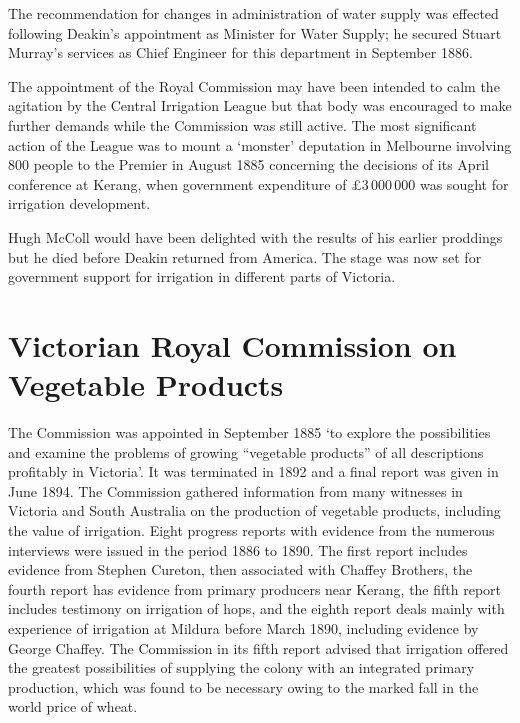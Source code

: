 The recommendation for changes in administration of water supply was
effected following Deakin's appointment as Minister for Water Supply;
he secured Stuart Murray's  services as Chief
Engineer for this department in September 1886.

The appointment of the Royal Commission may have been intended to calm
the agitation by the Central Irrigation League  but that body was encouraged to make further
demands while the Commission was still active.  The most significant
action of the League was to mount a `monster' deputation in Melbourne
involving 800 people to the Premier in August 1885 concerning the
decisions of its April conference at Kerang,  when
government expenditure of \pounds3\,000\,000 was sought for irrigation
development.

Hugh McColl would have been delighted with the results of his earlier
proddings but he died before Deakin returned from America.  The stage
was now set for government support for irrigation in different parts
of Victoria.

\section*{Victorian Royal Commission on Vegetable Products}

The Commission was appointed in September 1885 `to explore the
possibilities and examine the problems of growing ``vegetable
products'' of all descriptions profitably in Victoria'.  It was
terminated in 1892 and a final report was given in June 1894.  The
Commission gathered information from many witnesses in Victoria and
South Australia on the production of vegetable products, including the
value of irrigation.  Eight progress reports with evidence from the
numerous interviews were issued in the period 1886 to 1890.  The first
report includes evidence from Stephen Cureton, 
then associated with Chaffey Brothers,  the fourth
report has evidence from primary producers near Kerang, the fifth
report includes testimony on irrigation of hops, and the eighth report
deals mainly with experience of irrigation at Mildura 
before March 1890, including evidence by George
Chaffey.   The Commission in its fifth report
advised that irrigation offered the greatest possibilities of
supplying the colony with an integrated primary production, which was
found to be necessary owing to the marked fall in the world price of
wheat.

